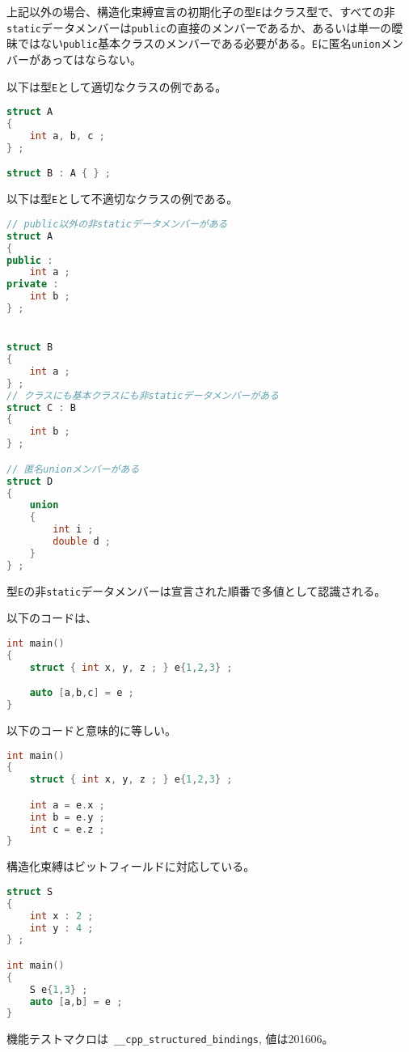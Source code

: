 %

上記以外の場合、構造化束縛宣言の初期化子の型\lstinline!E!はクラス型で、すべての非\lstinline!static!データメンバーは\lstinline!public!の直接のメンバーであるか、あるいは単一の曖昧ではない\lstinline!public!基本クラスのメンバーである必要がある。\lstinline!E!に匿名\lstinline!union!メンバーがあってはならない。

以下は型\lstinline!E!として適切なクラスの例である。

\begin{lstlisting}[language=C++]
struct A
{
    int a, b, c ;
} ;

struct B : A { } ;
\end{lstlisting}

以下は型\lstinline!E!として不適切なクラスの例である。

\begin{lstlisting}[language=C++]
// public以外の非staticデータメンバーがある
struct A
{
public :
    int a ;
private :
    int b ;
} ;


struct B
{
    int a ;
} ;
// クラスにも基本クラスにも非staticデータメンバーがある
struct C : B
{
    int b ;
} ;

// 匿名unionメンバーがある
struct D
{
    union
    {
        int i ;
        double d ;
    }
} ;
\end{lstlisting}

型\lstinline!E!の非\lstinline!static!データメンバーは宣言された順番で多値として認識される。

以下のコードは、
\begin{lstlisting}[language=C++]
int main()
{
    struct { int x, y, z ; } e{1,2,3} ;

    auto [a,b,c] = e ;
}
\end{lstlisting}
以下のコードと意味的に等しい。
\begin{lstlisting}[language=C++]
int main()
{
    struct { int x, y, z ; } e{1,2,3} ;

    int a = e.x ;
    int b = e.y ;
    int c = e.z ;
}
\end{lstlisting}

構造化束縛はビットフィールドに対応している。

\begin{lstlisting}[language=C++]
struct S
{
    int x : 2 ;
    int y : 4 ;
} ;

int main()
{
    S e{1,3} ;
    auto [a,b] = e ;
}
\end{lstlisting}

機能テストマクロは~\lstinline!__cpp_structured_bindings!, 値は201606。
